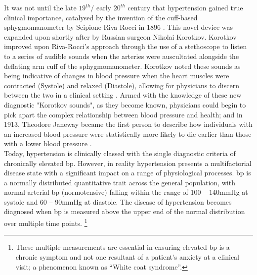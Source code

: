 It was not until the late $19^{th}$/ early $20^{th}$ century that hypertension gained true clinical importance, catalysed by the invention of the cuff-based sphygmomanometer by Scipione Riva-Rocci in 1896 \cite{Riva-Rocci1896}. This novel device was expanded upon shortly after by Russian surgeon Nikolai Korotkov. Korotkov improved upon Riva-Rocci's approach through the use of a stethoscope to listen to a series of audible sounds when the arteries were auscultated alongside the deflating arm cuff of the sphygmomanometer. Korotkov noted these sounds as being indicative of changes in blood pressure when the heart muscles were contracted (Systole) and relaxed (Diastole), allowing for physicians to discern between the two in a clinical setting \cite{Shevchenko1996}. Armed with the knowledge of these new diagnostic "Korotkov sounds", as they become known, physicians could begin to pick apart the complex relationship between blood pressure and health; and in 1913, Theodore Janeway became the first person to describe how individuals with an increased blood pressure were statistically more likely to die earlier than those with a lower blood pressure \cite{10.1001/archinte.1913.00070060147012}. \\

Today, hypertension is clinically classed with the single diagnostic criteria of chronically elevated \acrfull{bp}. However, in reality hypertension presents a multifactorial disease state with a significant impact on a range of physiological processes. \acrshort{bp} is a normally distributed quantitative trait across the general population, with normal arterial \acrshort{bp} (normotensive) falling within the range of 100 – 140mmHg at systole and 60 – 90mmHg at diastole. The disease of hypertension becomes diagnosed when \acrlong{bp} is measured above the upper end of the normal distribution over multiple time points. \footnote[2]{These multiple measurements are essential in ensuring elevated \acrshort{bp} is a chronic symptom and not one resultant of a patient's anxiety at a clinical visit; a phenomenon known as “White coat syndrome”.} 


